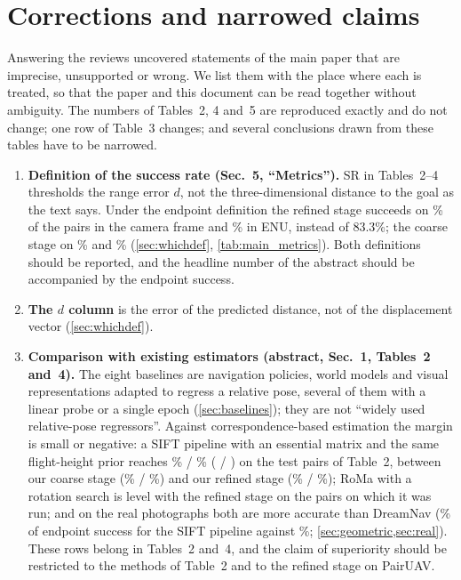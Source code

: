 \section{Corrections and narrowed claims}
\label{sec:corrections}

Answering the reviews uncovered statements of the main paper that are imprecise, unsupported or wrong. We list them with the place where each is treated, so that the paper and this document can be read together without ambiguity. The numbers of Tables~2, 4 and~5 are reproduced exactly and do not change; one row of Table~3 changes; and several conclusions drawn from these tables have to be narrowed.

\begin{enumerate}[leftmargin=*,itemsep=2pt,topsep=3pt]
\item \textbf{Definition of the success rate (Sec.~5, ``Metrics'').} SR in Tables~2--4 thresholds the range error $d$, not the three-dimensional distance to the goal as the text says. Under the endpoint definition the refined stage succeeds on \SiiCamSRe\% of the pairs in the camera frame and \SiiEnuSRe\% in ENU, instead of 83.3\%; the coarse stage on \SiCamSRe\% and \SiEnuSRe\% (\cref{sec:whichdef}, \cref{tab:main_metrics}). Both definitions should be reported, and the headline number of the abstract should be accompanied by the endpoint success.
\item \textbf{The $d$ column} is the error of the predicted distance, not of the displacement vector (\cref{sec:whichdef}).
\item \textbf{Comparison with existing estimators (abstract, Sec.~1, Tables~2 and~4).} The eight baselines are navigation policies, world models and visual representations adapted to regress a relative pose, several of them with a linear probe or a single epoch (\cref{sec:baselines}); they are not ``widely used relative-pose regressors''. Against correspondence-based estimation the margin is small or negative: a SIFT pipeline with an essential matrix and the same flight-height prior reaches \sfSiftSRd\% / \sfSiftSRe\% (\SRd{} / \SRe) on the test pairs of Table~2, between our coarse stage (\sfSiSRd\% / \sfSiSRe\%) and our refined stage (\sfSiiSRd\% / \sfSiiSRe\%); RoMa with a rotation search is level with the refined stage on the pairs on which it was run; and on the real photographs both are more accurate than DreamNav (\grSiftSRe\% of endpoint success for the SIFT pipeline against \grSiiSRe\%; \cref{sec:geometric,sec:real}). These rows belong in Tables~2 and~4, and the claim of superiority should be restricted to the methods of Table~2 and to the refined stage on PairUAV.

\end{enumerate}
